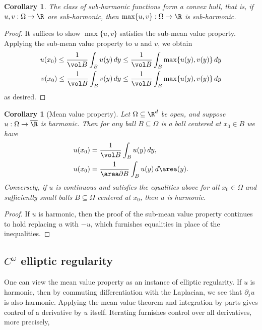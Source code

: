 \documentclass[reqno]{amsart}
\newtheorem{corollary}[theorem]{Corollary}
\theoremstyle{definition}
\theoremstyle{remark}
\begin{document}
\begin{corollary}
	The class of sub-harmonic functions form a convex hull, that is, if $u, v : \Omega \to \R$ are sub-harmonic, then $\max \{ u, v \} : \Omega \to \R$ is sub-harmonic. 
\end{corollary}

\begin{proof}
	It suffices to show $\max \{u, v \}$ satisfies the sub-mean value property. Applying the sub-mean value property to $u$ and $v$, we obtain
		\begin{align*}
			 u(x_0) \leq \frac{1}{\vol B} \int_B u(y) \, dy \leq \frac{1}{\vol B} \int_B \max \{u(y), v(y) \} \, dy \\
			v(x_0) \leq \frac{1}{\vol B} \int_B v(y) \, dy \leq \frac{1}{\vol B} \int_B \max \{u(y), v(y) \} \, dy 
		\end{align*} 
	as desired. 	
\end{proof}

\begin{corollary}[Mean value property]
	Let $\Omega \subseteq \R^d$ be open, and suppose $u : \Omega \to \overline \R$ is harmonic. Then for any ball $B \subseteq \Omega$ is a ball centered at $x_0 \in B$ we have
		\begin{align*}
			u(x_0) 
				&= \frac{1}{\vol B} \int_B u(y) \, dy, \\
			u(x_0)
				&= \frac{1}{\area \partial B} \int_B u(y) \, d \area(y).
		\end{align*}
	Conversely, if $u$ is continuous and satisfies the equalities above for all $x_0 \in \Omega$ and sufficiently small balls $B \subseteq \Omega$ centered at $x_0$, then $u$ is harmonic.
\end{corollary}	

\begin{proof}
	If $u$ is harmonic, then the proof of the sub-mean value property continues to hold replacing $u$ with $-u$, which furnishes equalities in place of the inequalities. 
\end{proof}

\subsection{$C^\omega$ elliptic regularity}

One can view the mean value property as an instance of elliptic regularity. If $u$ is harmonic, then by commuting differentiation with the Laplacian, we see that $\partial_j u$ is also harmonic. Applying the mean value theorem and integration by parts gives control of a derivative by $u$ itself. Iterating furnishes control over all derivatives, more precisely,
\end{document}
